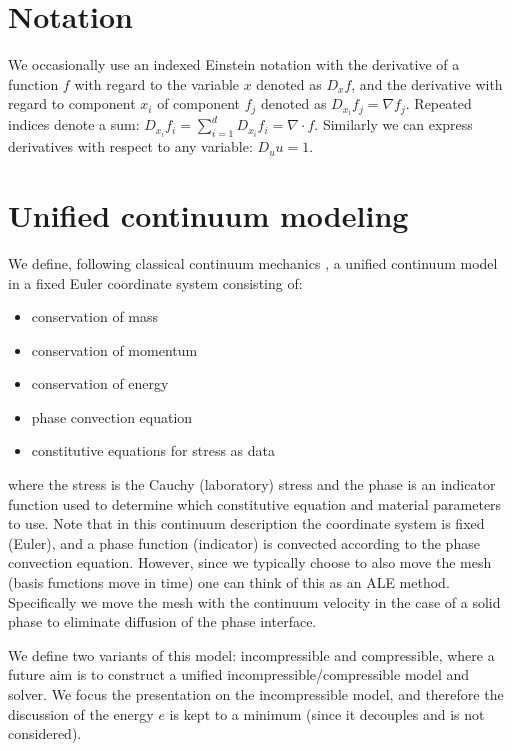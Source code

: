 
\section{Notation}

We occasionally use an indexed Einstein notation with the derivative of a
function $f$ with regard to the variable $x$ denoted as $D_x f$, and
the derivative with regard to component $x_i$ of component $f_j$
denoted as $D_{x_i} f_j = \nabla f_j$. Repeated indices denote a sum:
$D_{x_i} f_i = \sum_{i=1}^d D_{x_i} f_i = \nabla \cdot f$. Similarly
we can express derivatives with respect to any variable: $D_u u = 1$.
\section{Unified continuum modeling}


We define, following classical continuum mechanics \cite{Gurtin1981}, a
unified continuum model in a fixed Euler coordinate system consisting
of:
\begin{itemize}
\item
conservation of mass
\item
conservation of momentum
\item
conservation of energy
\item
phase convection equation
\item
constitutive equations for stress as data
\end{itemize}
where the stress is the Cauchy (laboratory) stress and the phase is an
indicator function used to determine which constitutive equation and
material parameters to use. Note that in this continuum description
the coordinate system is fixed (Euler), and a phase function
(indicator) is convected according to the phase convection
equation. However, since we typically choose to also move the mesh
(basis functions move in time) one can think of this as an ALE
method. Specifically we move the mesh with the continuum velocity in
the case of a solid phase to eliminate diffusion of the phase
interface.

We define two variants of this model: incompressible and compressible,
where a future aim is to construct a unified
incompressible/compressible model and solver. We focus the
presentation on the incompressible model, and therefore the discussion
of the energy $e$ is kept to a minimum (since it decouples and is not
considered).

